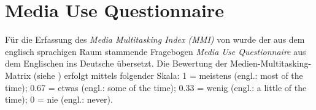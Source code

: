 %
%
\glsresetall
\let\raggedsection\centering 
{}\label{chap.appendix_a}
\let\raggedsection\raggedright 

\section{Media Use Questionnaire}\label{appendix.muq}
Für die Erfassung des \textit{Media Multitasking Index (MMI)} von  wurde der aus dem englisch sprachigen Raum stammende Fragebogen \textit{Media Use Questionnaire} aus dem Englischen ins Deutsche übersetzt.
Die Bewertung der Medien-Multitasking-Matrix (siehe ) erfolgt mittels folgender Skala: 1 = meistens (engl.: most of the time); 0.67 = etwas (engl.: some of the time); 0.33 = wenig (engl.: a little of the time); 0 = nie (engl.: never).  \\

